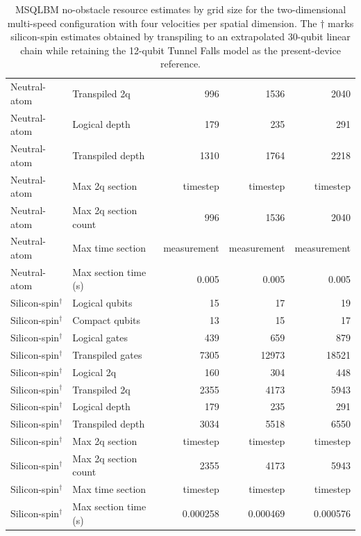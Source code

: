 \begin{table}
\begin{tabular}{llrrr}
Neutral-atom & Transpiled 2q & 996 & 1536 & 2040 \\
Neutral-atom & Logical depth & 179 & 235 & 291 \\
Neutral-atom & Transpiled depth & 1310 & 1764 & 2218 \\
Neutral-atom & Max 2q section & timestep & timestep & timestep \\
Neutral-atom & Max 2q section count & 996 & 1536 & 2040 \\
Neutral-atom & Max time section & measurement & measurement & measurement \\
Neutral-atom & Max section time (s) & 0.005 & 0.005 & 0.005 \\
\hline
Silicon-spin$^{\dagger}$ & Logical qubits & 15 & 17 & 19 \\
Silicon-spin$^{\dagger}$ & Compact qubits & 13 & 15 & 17 \\
Silicon-spin$^{\dagger}$ & Logical gates & 439 & 659 & 879 \\
Silicon-spin$^{\dagger}$ & Transpiled gates & 7305 & 12973 & 18521 \\
Silicon-spin$^{\dagger}$ & Logical 2q & 160 & 304 & 448 \\
Silicon-spin$^{\dagger}$ & Transpiled 2q & 2355 & 4173 & 5943 \\
Silicon-spin$^{\dagger}$ & Logical depth & 179 & 235 & 291 \\
Silicon-spin$^{\dagger}$ & Transpiled depth & 3034 & 5518 & 6550 \\
Silicon-spin$^{\dagger}$ & Max 2q section & timestep & timestep & timestep \\
Silicon-spin$^{\dagger}$ & Max 2q section count & 2355 & 4173 & 5943 \\
Silicon-spin$^{\dagger}$ & Max time section & timestep & timestep & timestep \\
Silicon-spin$^{\dagger}$ & Max section time (s) & 0.000258 & 0.000469 & 0.000576 \\
\hline
\end{tabular}
\caption{MSQLBM no-obstacle resource estimates by grid size for the two-dimensional multi-speed configuration with four velocities per spatial dimension. The \(\dagger\) marks silicon-spin estimates obtained by transpiling to an extrapolated 30-qubit linear chain while retaining the 12-qubit Tunnel Falls model as the present-device reference.}
\label{tab:ms-qlbm-grid-resources}
\end{table}
